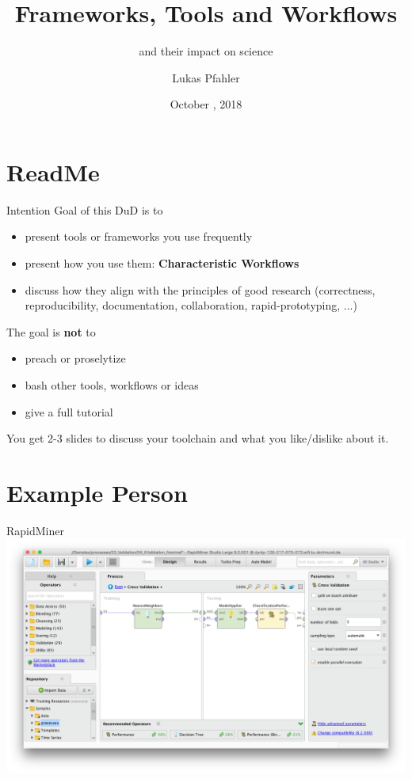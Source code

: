 \documentclass[aspectratio=169,10pt]{beamer}
\title{Frameworks, Tools and Workflows}
\subtitle{and their impact on science}
\date{October \nth{25}, 2018}
\author{Lukas Pfahler}
\institute{TU Dortmund University, Chair for Artificial Intelligence}
\begin{document}
\maketitle
\section{ReadMe}
\begin{frame}{Intention}
Goal of this DuD is to
\begin{itemize}
    \item present tools or frameworks you use frequently
    \item present how you use them: \textbf{Characteristic Workflows}
    \item discuss how they align with the principles of good research (correctness, reproducibility, documentation, collaboration, rapid-prototyping, ...)
\end{itemize}
The goal is \textbf{not} to
\begin{itemize}
    \item preach or proselytize
    \item bash other tools, workflows or ideas
    \item give a full tutorial
\end{itemize}
You get 2-3 slides to discuss your toolchain and what you like/dislike about it.
\end{frame}
\section{Example Person}
\begin{frame}[fragile]{RapidMiner}
\includegraphics[width=\linewidth]{rapidminer.png}
\end{frame}
\end{document}
